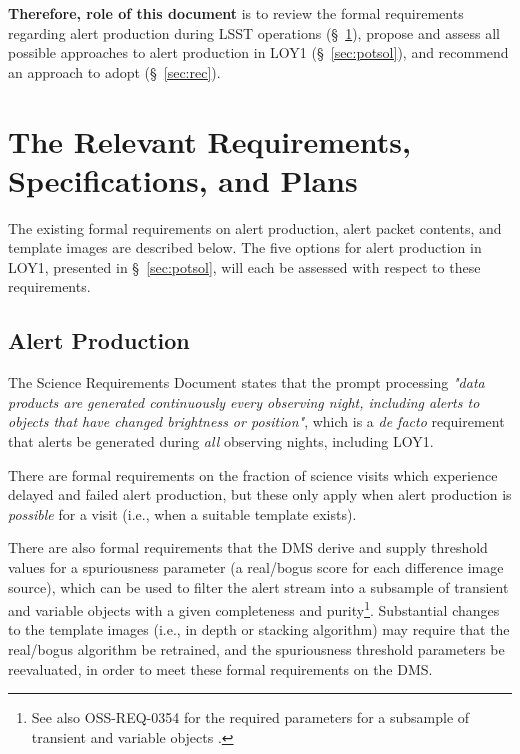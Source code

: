 \documentclass[DM,lsstdraft,toc]{lsstdoc}
\begin{document}
{\bf Therefore, role of this document} is to 
review the formal requirements regarding alert production during LSST operations (\S~\ref{sec:req}),
propose and assess all possible approaches to alert production in LOY1 (\S~\ref{sec:potsol}), and
recommend an approach to adopt (\S~\ref{sec:rec}).

\clearpage
\section{The Relevant Requirements, Specifications, and Plans}\label{sec:req}

The existing formal requirements on alert production, alert packet contents, and template images are described below. The five options for alert production in LOY1, presented in \S~\ref{sec:potsol}, will each be assessed with respect to these requirements.

\subsection{Alert Production}\label{ssec:req_ap}

The Science Requirements Document  states that the prompt processing {\it "data products are generated continuously every observing night, including alerts to objects that have changed brightness or position"}, which is a {\it de facto} requirement that alerts be generated during {\it all} observing nights, including LOY1.

There are formal requirements on the fraction of science visits which experience delayed and failed alert production, but these only apply when alert production is {\em possible} for a visit (i.e., when a suitable template exists).

There are also formal requirements that the DMS derive and supply threshold values for a spuriousness parameter (a real/bogus score for each difference image source), which can be used to filter the alert stream into a subsample of transient and variable objects with a given completeness and purity\footnote{See also OSS-REQ-0354 for the required parameters for a subsample of transient and variable objects .}. Substantial changes to the template images (i.e., in depth or stacking algorithm) may require that the real/bogus algorithm be retrained, and the spuriousness threshold parameters be reevaluated, in order to meet these formal requirements on the DMS.
\end{document}
